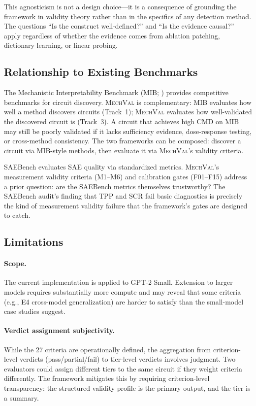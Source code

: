 \documentclass[10pt]{article}
\newcommand{\mechval}{\textsc{MechVal}}
\newcommand{\eg}{e.g.}
\begin{document}
This agnosticism is not a design choice---it is a consequence of grounding the framework in validity theory rather than in the specifics of any detection method. The questions ``Is the construct well-defined?'' and ``Is the evidence causal?'' apply regardless of whether the evidence comes from ablation patching, dictionary learning, or linear probing.

\subsection{Relationship to Existing Benchmarks}

The Mechanistic Interpretability Benchmark (MIB; \citealp{mueller2025mib}) provides competitive benchmarks for circuit discovery. \mechval{} is complementary: MIB evaluates how well a method discovers circuits (Track~1); \mechval{} evaluates how well-validated the discovered circuit is (Track~3). A circuit that achieves high CMD on MIB may still be poorly validated if it lacks sufficiency evidence, dose-response testing, or cross-method consistency. The two frameworks can be composed: discover a circuit via MIB-style methods, then evaluate it via \mechval{}'s validity criteria.

SAEBench evaluates SAE quality via standardized metrics. \mechval{}'s measurement validity criteria (M1--M6) and calibration gates (F01--F15) address a prior question: are the SAEBench metrics themselves trustworthy? The SAEBench audit's finding that TPP and SCR fail basic diagnostics is precisely the kind of measurement validity failure that the framework's gates are designed to catch.

\subsection{Limitations}

\paragraph{Scope.} The current implementation is applied to GPT-2 Small. Extension to larger models requires substantially more compute and may reveal that some criteria (\eg, E4 cross-model generalization) are harder to satisfy than the small-model case studies suggest.

\paragraph{Verdict assignment subjectivity.} While the 27 criteria are operationally defined, the aggregation from criterion-level verdicts (pass/partial/fail) to tier-level verdicts involves judgment. Two evaluators could assign different tiers to the same circuit if they weight criteria differently. The framework mitigates this by requiring criterion-level transparency: the structured validity profile is the primary output, and the tier is a summary.
\end{document}
